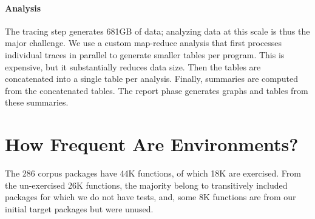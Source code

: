 \documentclass[sigplan,screen]{acmart}
\newcommand{\envtracer}{{\sf envtracer}\xspace}
\newcommand{\rdyntrace}{{\sf R-dyntrace}\xspace}
\begin{document}
\paragraph{Analysis} The tracing step generates 681GB of data; analyzing data at
this scale is thus the major challenge. We use a custom map-reduce analysis that
first processes individual traces in parallel to generate smaller tables per
program. This is expensive, but it substantially reduces data size. Then the
tables are concatenated into a single table per analysis. Finally, summaries are
computed from the concatenated tables. The report phase generates graphs and
tables from these summaries.



\section{How Frequent Are Environments?}

The 286 corpus packages have 44K functions, of which 18K are exercised. From the
un-exercised 26K functions, the majority belong to transitively included
packages for which we do not have tests, and, some 8K functions are from our
initial target packages but were unused.
\end{document}
